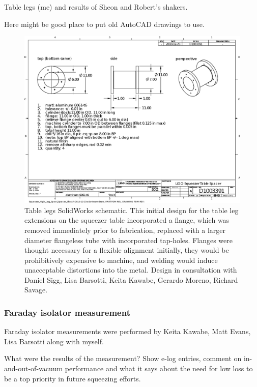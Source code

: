                 Table legs (me) and results of Sheon and Robert's shakers.

		Here might be good place to put old AutoCAD drawings to use.
\begin{figure}
\begin{center}
\includegraphics[width=0.6\paperwidth]{Squeezer_High_Leg_Spool_Spacer_2010-12-23_aluminum.eps}
\caption{Table legs SolidWorks schematic. This initial design for the table leg extensions on the squeezer table incorporated a flange, which was removed immediately prior to fabrication, replaced with a larger diameter flangeless tube with incorporated tap-holes. Flanges were thought necessary for a flexible alignment initially, they would be prohibitively expensive to machine, and welding would induce unacceptable distortions into the metal. Design in consultation with Daniel Sigg, Lisa Barsotti, Keita Kawabe, Gerardo Moreno, Richard Savage.
}
\end{center}
\end{figure}


            \subsubsection{Faraday isolator measurement}
            \label{Faraday}

                Faraday isolator measurements were performed by Keita Kawabe, Matt Evans, Lisa Barsotti along with myself.

		What were the results of the measurement? Show e-log entries, comment on in-and-out-of-vacuum performance and what it says about the need for low loss to be a top priority in future squeezing efforts.

